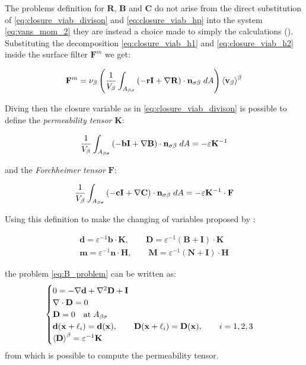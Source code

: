 The problems definition for $\mathbf{R}$, $\mathbf{B}$ and $\mathbf{C}$ do not arise from the direct substitution of \eqref{eq:closure_viab_divison} and 	\eqref{eq:closure_viab_hp} into the system \eqref{eq:vans_mom_2} they are instead a choice made to simply the calculations (\citet{whitaker1996forchheimer}). Substituting the decomposition \eqref{eq:closure_viab_h1} and \eqref{eq:closure_viab_h2} inside the surface filter $\mathbf{F}^m$ we get:

$$
\mathbf{F}^m = \nu_{\beta} \left(\dfrac{1}{V_\beta} \int_{A_{\beta \sigma}}  \left(-\mathbf{r}\mathbf{I}  +  \nabla \mathbf{R} \right) \cdot \mathbf{n}_{\sigma \beta} \;dA \right) {\left< \textbf{v}_{\beta} \right>}^{\beta}
$$

Diving then the closure variable as in \eqref{eq:closure_viab_divison} is possible to define the \textit{permeability tensor} $\mathbf{K}$:

$$
 \dfrac{1}{V_\beta} \int_{A_{\beta \sigma}}  \left(-\mathbf{b}\mathbf{I}  +  \nabla \mathbf{B} \right) \cdot \mathbf{n}_{\sigma \beta} \;dA = -\varepsilon \mathbf{K}^{-1}
$$

and the \textit{Forchheimer tensor} $\mathbf{F}$:

$$
\dfrac{1}{V_\beta} \int_{A_{\beta \sigma}} \left(-\mathbf{c}\mathbf{I}  +  \nabla \mathbf{C} \right) \cdot \mathbf{n}_{\sigma \beta} \;dA = -\varepsilon \mathbf{K}^{-1} \cdot \mathbf{F}
$$

Using this definition to make the changing of variables proposed by \citet{barrere1992closure}:


\begin{eqnarray}
	\mathbf{d} = \varepsilon^{-1} \mathbf{b} \cdot \mathbf{K}, \qquad \mathbf{D} = \varepsilon^{-1} \left(\mathbf{B} + \mathbf{I} \right)\cdot \mathbf{K} \\
\mathbf{m} = \varepsilon^{-1} \mathbf{n} \cdot \mathbf{H}, \qquad \mathbf{M} = \varepsilon^{-1} \left(\mathbf{N} + \mathbf{I} \right)\cdot \mathbf{H} \label{eq:barrere2}
\end{eqnarray}


the problem \eqref{eq:B_problem} can be written as:
\begin{eqnarray}
	\begin{cases}
		0 = -\nabla \mathbf{d} + \nabla^2 \mathbf{D} +\mathbf{I}\\
		\nabla \cdot \mathbf{D} = 0  \\
		\mathbf{D} = 0 \quad \textrm{at} \; A_{\beta \sigma} \\
		\mathbf{d}(\mathbf{x} +\ell_i) = \mathbf{d}(\mathbf{x}), \qquad \mathbf{D}(\mathbf{x} +\ell_i) = \mathbf{D}(\mathbf{x}), \qquad i=1,2,3 \\
		{\left< \mathbf{D} \right>}^{\beta} = \varepsilon^{-1} \mathbf{K}
	\end{cases}
\label{eq:D_problem}
\end{eqnarray}
from which is possible to compute the permeability tensor.

